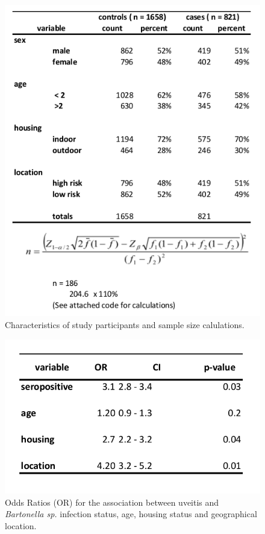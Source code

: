 \documentclass[11pt,twocolumn]{article}
\begin{document}
\begin{figure}[h!]
	\centering
	\includegraphics[scale=0.5]{table1.jpg}
	\caption{Characteristics of study participants and sample size calulations.}
	\label{tab:1}
\end{figure}
 
\begin{figure}[h!]
	\centering
	\includegraphics[scale=0.5]{table2.jpg}
	\caption{Odds Ratios (OR) for the association between uveitis and \emph{Bartonella sp.} infection status, age, housing status and geographical location.}
	\label{tab:2}
\end{figure}
\end{document}
